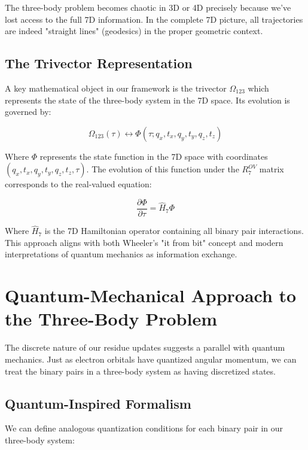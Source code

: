 \documentclass{article}
\begin{document}
The three-body problem becomes chaotic in 3D or 4D precisely because we've lost access to the full 7D information. In the complete 7D picture, all trajectories are indeed "straight lines" (geodesics) in the proper geometric context.

\subsection{The Trivector Representation}

A key mathematical object in our framework is the trivector $\Omega_{123}$ which represents the state of the three-body system in the 7D space. Its evolution is governed by:

\begin{equation}
\Omega_{123}(\tau) \leftrightarrow \Phi(\tau; q_x, t_x, q_y, t_y, q_z, t_z)
\end{equation}

Where $\Phi$ represents the state function in the 7D space with coordinates $(q_x, t_x, q_y, t_y, q_z, t_z, \tau)$. The evolution of this function under the $R^{OV}_7$ matrix corresponds to the real-valued equation:

\begin{equation}
\frac{\partial \Phi}{\partial \tau} = \hat{H}_7 \Phi
\end{equation}

Where $\hat{H}_7$ is the 7D Hamiltonian operator containing all binary pair interactions. This approach aligns with both Wheeler's "it from bit" concept and modern interpretations of quantum mechanics as information exchange.

\section{Quantum-Mechanical Approach to the Three-Body Problem}

The discrete nature of our residue updates suggests a parallel with quantum mechanics. Just as electron orbitals have quantized angular momentum, we can treat the binary pairs in a three-body system as having discretized states.

\subsection{Quantum-Inspired Formalism}

We can define analogous quantization conditions for each binary pair in our three-body system:
\end{document}
